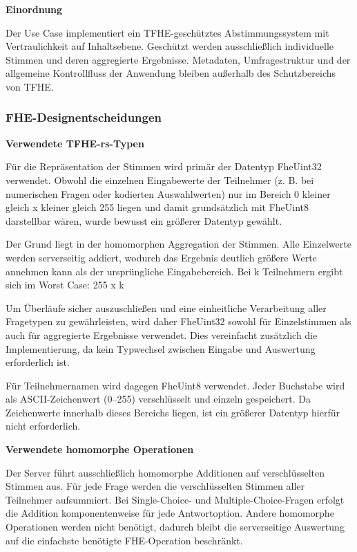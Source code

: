 \textbf{Einordnung}

Der Use Case implementiert ein TFHE-geschütztes Abstimmungssystem mit Vertraulichkeit auf Inhaltsebene. Geschützt werden ausschließlich individuelle Stimmen und deren aggregierte Ergebnisse. Metadaten, Umfragestruktur und der allgemeine Kontrollfluss der Anwendung bleiben außerhalb des Schutzbereichs von TFHE.

\subsubsection{FHE-Designentscheidungen}

\textbf{Verwendete TFHE-rs-Typen}

Für die Repräsentation der Stimmen wird primär der Datentyp FheUint32 verwendet. Obwohl die einzelnen Eingabewerte der Teilnehmer (z. B. bei numerischen Fragen oder kodierten Auswahlwerten) nur im Bereich 0 kleiner gleich x kleiner gleich 255 liegen und damit grundsätzlich mit FheUint8 darstellbar wären, wurde bewusst ein größerer Datentyp gewählt.

Der Grund liegt in der homomorphen Aggregation der Stimmen. Alle Einzelwerte werden serverseitig addiert, wodurch das Ergebnis deutlich größere Werte annehmen kann als der ursprüngliche Eingabebereich. Bei k Teilnehmern ergibt sich im Worst Case: 255 x k

Um Überläufe sicher auszuschließen und eine einheitliche Verarbeitung aller Fragetypen zu gewährleisten, wird daher FheUint32 sowohl für Einzelstimmen als auch für aggregierte Ergebnisse verwendet. Dies vereinfacht zusätzlich die Implementierung, da kein Typwechsel zwischen Eingabe und Auswertung erforderlich ist.

Für Teilnehmernamen wird dagegen FheUint8 verwendet. Jeder Buchstabe wird als ASCII-Zeichenwert (0–255) verschlüsselt und einzeln gespeichert. Da Zeichenwerte innerhalb dieses Bereichs liegen, ist ein größerer Datentyp hierfür nicht erforderlich.

\textbf{Verwendete homomorphe Operationen}

Der Server führt ausschließlich homomorphe Additionen auf verschlüsselten Stimmen aus. Für jede Frage werden die verschlüsselten Stimmen aller Teilnehmer aufsummiert. Bei Single-Choice- und Multiple-Choice-Fragen erfolgt die Addition komponentenweise für jede Antwortoption. Andere homomorphe Operationen werden nicht benötigt, dadurch bleibt die serverseitige Auswertung auf die einfachste benötigte FHE-Operation beschränkt.


